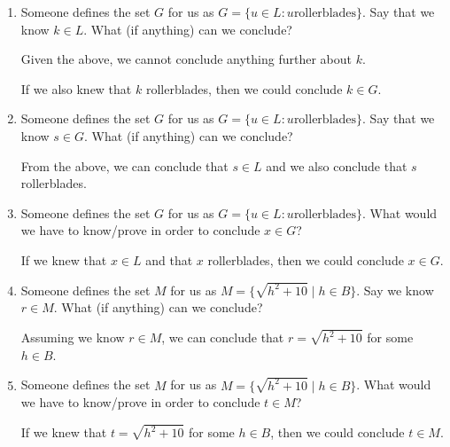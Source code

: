 \documentclass{article}
\begin{document}
\begin{enumerate}

    \item Someone defines the set $G$ for us as $G = \{u \in L : u \text{
                  rollerblades}\}$. Say that we know $k \in L$. What (if anything) can we
          conclude?

          Given the above, we cannot conclude anything further about $k$.

          If we also knew that $k$ rollerblades, then we could conclude $k \in G$.

          \newpage

    \item Someone defines the set $G$ for us as $G = \{u \in L : u \text{
                  rollerblades}\}$. Say that we know $s \in G$. What (if anything) can we
          conclude?

          From the above, we can conclude that $s \in L$ and we also conclude that $s$
          rollerblades.

          \newpage

    \item Someone defines the set $G$ for us as $G = \{u \in L : u \text{
                  rollerblades}\}$. What would we have to know/prove in order to conclude $x \in
              G$?

          If we knew that $x \in L$ and that $x$ rollerblades, then we could conclude $x
              \in G$.

          \newpage

    \item Someone defines the set $M$ for us as $M = \{\sqrt{h^2+10} \mid h \in B\}$. Say
          we know $r \in M$. What (if anything) can we conclude?

          Assuming we know $r \in M$, we can conclude that $r = \sqrt{h^2+10}$ for some
          $h \in B$.

          \newpage

    \item Someone defines the set $M$ for us as $M = \{\sqrt{h^2+10} \mid h \in B\}$.
          What would we have to know/prove in order to conclude $t \in M$?

          If we knew that $t = \sqrt{h^2+10}$ for some $h \in B$, then we could conclude
          $t \in M$.

\end{enumerate}
\end{document}
